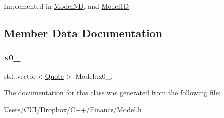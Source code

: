 Implemented in \hyperlink{class_model_n_d_a62866814432b7c0a0d8f58223cc6279d}{Model\+ND}, and \hyperlink{class_model1_d_a08b3a9f594214b5e3bcba3fe5f63524e}{Model1D}.



\subsection{Member Data Documentation}
\hypertarget{class_model_aea7cb62b50849b8c9beef1493435241e}{}\label{class_model_aea7cb62b50849b8c9beef1493435241e} 
\subsubsection{\texorpdfstring{x0\+\_\+}{x0\_}}
{\footnotesize\ttfamily std\+::vector$<$\hyperlink{_name_def_8h_a642a6c5fd87319d922637de0e0bb0305}{Quote}$>$ Model\+::x0\+\_\+\hspace{0.3cm}{\ttfamily [mutable]}, {\ttfamily [protected]}}



The documentation for this class was generated from the following file\+:\begin{DoxyCompactItemize}
\item 
Users/\+C\+U\+I/\+Dropbox/\+C++/\+Finance/\hyperlink{_model_8h}{Model.\+h}\end{DoxyCompactItemize}

